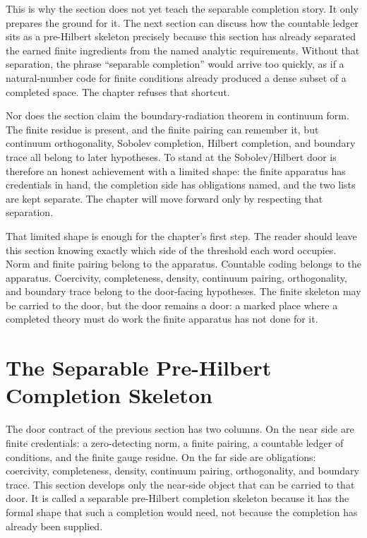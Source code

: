 This is why the section does not yet teach the separable completion story. It
only prepares the ground for it. The next section can discuss how the
countable ledger sits as a pre-Hilbert skeleton precisely because this section
has already separated the earned finite ingredients from the named analytic
requirements. Without that separation, the phrase ``separable completion''
would arrive too quickly, as if a natural-number code for finite conditions
already produced a dense subset of a completed space. The chapter refuses that
shortcut.

Nor does the section claim the boundary-radiation theorem in continuum form.
The finite residue is present, and the finite pairing can remember it, but
continuum orthogonality, Sobolev completion, Hilbert completion, and boundary
trace all belong to later hypotheses. To stand at the Sobolev/Hilbert door is
therefore an honest achievement with a limited shape: the finite apparatus has
credentials in hand, the completion side has obligations named, and the two
lists are kept separate. The chapter will move forward only by respecting that
separation.

That limited shape is enough for the chapter's first step. The reader should
leave this section knowing exactly which side of the threshold each word
occupies. Norm and finite pairing belong to the apparatus. Countable coding
belongs to the apparatus. Coercivity, completeness, density, continuum pairing,
orthogonality, and boundary trace belong to the door-facing hypotheses. The
finite skeleton may be carried to the door, but the door remains a door: a
marked place where a completed theory must do work the finite apparatus has
not done for it.

\section{The Separable Pre-Hilbert Completion Skeleton}

The door contract of the previous section has two columns. On the near side are
finite credentials: a zero-detecting norm, a finite pairing, a countable ledger
of conditions, and the finite gauge residue. On the far side are obligations:
coercivity, completeness, density, continuum pairing, orthogonality, and
boundary trace. This section develops only the near-side object that can be
carried to that door. It is called a separable pre-Hilbert completion skeleton
because it has the formal shape that such a completion would need, not because
the completion has already been supplied.

